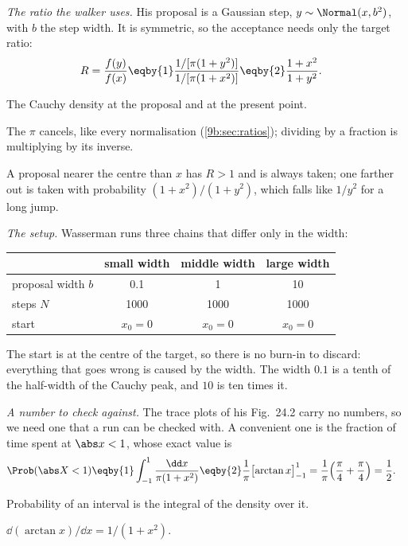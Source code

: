 \emph{The ratio the walker uses.} His proposal is a Gaussian step, $y\sim\Normal(x,b^2)$, with $b$
the step width. It is symmetric, so the acceptance needs only the target ratio:
\begin{align*}
  R=\frac{f(y)}{f(x)}
  &\eqby{1}\frac{1/[\pi(1+y^2)]}{1/[\pi(1+x^2)]}
   \eqby{2}\frac{1+x^2}{1+y^2}.
\end{align*}
\begin{explain}
  \item The Cauchy density at the proposal and at the present point.
  \item The $\pi$ cancels, like every normalisation (\cref{9b:sec:ratios}); dividing by a fraction
        is multiplying by its inverse.
\end{explain}
A proposal nearer the centre than $x$ has $R>1$ and is always taken; one farther out is taken
with probability $(1+x^2)/(1+y^2)$, which falls like $1/y^2$ for a long jump.

\emph{The setup.} Wasserman runs three chains that differ only in the width:
\begin{center}
\begin{tabular}{lccc}
\toprule
 & small width & middle width & large width\\
\midrule
proposal width $b$ & 0.1 & 1 & 10 \\
steps $N$ & 1000 & 1000 & 1000 \\
start & $x_0=0$ & $x_0=0$ & $x_0=0$ \\
\bottomrule
\end{tabular}
\end{center}
The start is at the centre of the target, so there is no burn-in to discard: everything that goes
wrong is caused by the width. The width $0.1$ is a tenth of the half-width of the Cauchy peak, and
$10$ is ten times it.

\emph{A number to check against.} The trace plots of his Fig.~24.2 carry no numbers, so we need
one that a run can be checked with. A convenient one is the fraction of time spent at
$\abs x<1$, whose exact value is
\begin{align*}
  \Prob(\abs X<1)
  &\eqby{1}\int_{-1}^{1}\frac{\dd x}{\pi(1+x^2)}
   \eqby{2}\frac{1}{\pi}\bigl[\arctan x\bigr]_{-1}^{1}
   =\frac1\pi\Bigl(\frac\pi4+\frac\pi4\Bigr)=\frac12 .
\end{align*}
\begin{explain}
  \item Probability of an interval is the integral of the density over it.
  \item $\dd(\arctan x)/\dd x=1/(1+x^2)$.
\end{explain}

